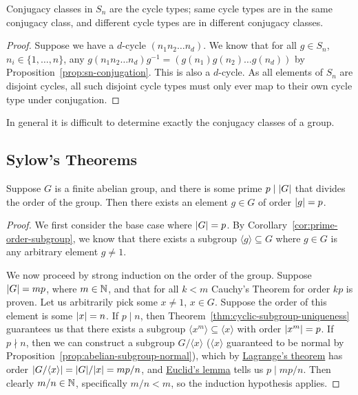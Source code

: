 \begin{theorem}
    Conjugacy classes in \(S_n\) are the cycle types;
    same cycle types are in the same conjugacy class,
    and different cycle types are in different conjugacy classes.
\end{theorem}
\begin{proof}
    Suppose we have a \(d\)-cycle \((n_1 n_2 \hdots n_d)\).
    We know that for all \(g \in S_n\), \(n_i \in \{1,\hdots,n\}\),
    any \(g(n_1 n_2 \hdots n_d)g^{-1} = (g(n_1) g(n_2) \hdots g(n_d))\)
    by Proposition~\ref{prop:sn-conjugation}.
    This is also a \(d\)-cycle.
    As all elements of \(S_n\) are disjoint cycles,
    all such disjoint cycle types must only ever map to their own cycle type
    under conjugation.
\end{proof}
\begin{remark}
    In general it is difficult to determine
    exactly the conjugacy classes of a group.
\end{remark}


\subsection{Sylow's Theorems}

\begin{theorem}\label{thm:cauchy}
    Suppose \(G\) is a finite abelian group,
    and there is some prime \(p \mid \abs{G}\)
    that divides the order of the group.
    Then there exists an element \(g \in G\) of order \(\abs{g} = p\).
\end{theorem}
\begin{proof}
    We first consider the base case where \(\abs{G} = p\).
    By Corollary~\ref{cor:prime-order-subgroup},
    we know that there exists a subgroup \(\langle g \rangle \subseteq G\)
    where \(g \in G\) is any arbitrary element \(g \neq 1\).

    We now proceed by strong induction on the order of the group.
    Suppose \(\abs{G} = mp\), where \(m \in \mathbb{N}\),
    and that for all \(k < m\) Cauchy's Theorem for order \(kp\) is proven.
    Let us arbitrarily pick some \(x \neq 1\), \(x \in G\).
    Suppose the order of this element is some \(\abs{x} = n\).
    If \(p \mid n\), then Theorem~\ref{thm:cyclic-subgroup-uniqueness}
    guarantees us that there exists a subgroup
    \(\langle x^m \rangle \subseteq \langle x \rangle\)
    with order \(\abs{x^m} = p\).
    If \(p \nmid n\), then we can construct a subgroup \(G/\langle x \rangle\)
    (\(\langle x \rangle\) guaranteed to be normal
    by Proposition~\ref{prop:abelian-subgroup-normal}),
    which by \hyperref[thm:lagrange]{Lagrange's theorem}
    has order \(\abs{G/\langle x \rangle} = \abs{G}/\abs{x} = mp/n\),
    and \hyperref[lem:euclid]{Euclid's lemma} tells us \(p \mid mp/n\).
    Then clearly \(m/n \in \mathbb{N}\), specifically \(m/n < m\),
    so the induction hypothesis applies.
\end{proof}

